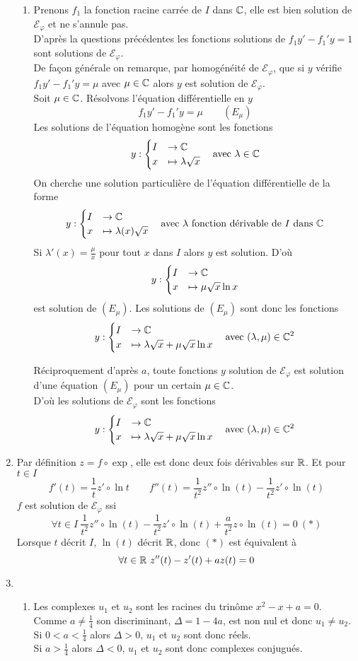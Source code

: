 \begin{enumerate}
\begin{enumerate}
\item Prenons $f_1$ la fonction racine carrée de $I$ dans $\mathbb{C}$, elle est bien solution de $\mathcal E_\varphi$ et ne s'annule pas.\\
D'après la questions précédentes les fonctions solutions de 
$f_1y'-f_1'y=1$
sont solutions de $\mathcal E_\varphi$. \\
De façon générale on remarque, par homogénéité de $\mathcal E_\varphi$, que si $y$ vérifie
$f_1y'-f_1'y=\mu$ avec $\mu\in\mathbb{C}$ alors  $y$ est solution de   $\mathcal E_\varphi$.\\
 Soit $\mu\in \mathbb{C}$. Résolvons l'équation différentielle en $y$ $$f_1y'-f_1'y=\mu\qquad (E_\mu)$$
Les solutions de l'équation homogène sont les fonctions 
$$y : \begin{cases}I &\rightarrow \mathbb{C} \\ x &\mapsto \lambda \sqrt x \end{cases}\quad\text{avec}\ \lambda\in\mathbb{C}$$
On cherche une solution  particulière de l'équation différentielle de la forme  
$$y : \begin{cases}I &\rightarrow \mathbb{C} \\ x &\mapsto \lambda(x) \sqrt x \end{cases}\quad\text{avec $\lambda$ fonction dérivable de $I$ dans $\mathbb{C}$}$$
Si $\lambda'(x)=\frac \mu x$ pour tout $x$ dans $I$ alors $y$ est solution. D'où
$$y : \begin{cases}I &\rightarrow \mathbb{C} \\ x &\mapsto \mu\sqrt x\ln x \end{cases}$$ est solution de $(E_\mu)$.
Les solutions de $(E_\mu)$ sont donc les fonctions 
$$y : \begin{cases}I &\rightarrow \mathbb{C} \\ x &\mapsto \lambda \sqrt x+\mu\sqrt x\ln x \end{cases}\quad\text{avec}\ (\lambda,\mu)\in\mathbb{C}^2$$

Réciproquement d'après $a$, toute fonctions $y$ solution de $\mathcal E_\varphi$ est solution d'une équation $(E_\mu)$ pour un certain $\mu\in\mathbb{C}$. \\
D'où les solutions de $\mathcal E_\varphi$ sont les fonctions 
$$y : \begin{cases}I &\rightarrow \mathbb{C} \\ x &\mapsto \lambda \sqrt x+\mu\sqrt x\ln x \end{cases}\quad\text{avec}\ (\lambda,\mu)\in\mathbb{C}^2$$

\end{enumerate}
\item Par définition $z=f\circ \exp$, elle est donc deux fois dérivables sur $\mathbb{R}$. Et pour $t\in I$
$$f'(t)=\frac 1t z'\circ \ln t\qquad f''(t)=\frac 1{t^2}z''\circ \ln (t)-\frac 1{t^2}z'\circ \ln (t)$$
 $f$ est solution de $\mathcal E_\varphi$ ssi 
$$\forall t\in I\ \frac 1{t^2}z''\circ \ln (t)-\frac 1{t^2}z'\circ \ln (t)+\frac a{t^2}z\circ \ln (t)=0\ (*)$$
Lorsque $t$ décrit $I$, $\ln(t)$ décrit $\mathbb{R}$, donc $(*)$ est équivalent à 
$$\forall t\in\R\ z''(t)-z'(t)+az(t)=0$$
\item 
\begin{enumerate}
\item 
Les complexes $u_1$ et $u_2$ sont les racines du trinôme $x^2-x+a=0$. Comme $a\neq\frac 14$ son discriminant, $\Delta=1-4a$, est non nul et donc $u_1\neq u_2$.\\
Si $0<a<\frac 14$ alors $\Delta>0$, $u_1$ et $u_2$ sont donc réels.\\
Si $a>\frac 14$ alors $\Delta<0$, $u_1$ et $u_2$ sont donc complexes conjugués.


\end{enumerate}
\end{enumerate}
